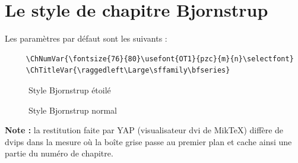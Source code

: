 \documentclass{report}
\begin{document}
    \section{Le style de chapitre Bjornstrup}
    Les paramètres par défaut sont les suivants :
    {\small\begin{verbatim}
     \ChNumVar{\fontsize{76}{80}\usefont{OT1}{pzc}{m}{n}\selectfont}
     \ChTitleVar{\raggedleft\Large\sffamily\bfseries}
    \end{verbatim}}
    \begin{figure}[h]
      \begin{minipage}{7 cm}
        \centerline{\color{gray!25}} 
        \caption{Style Bjornstrup \og étoilé \fg{}}
      \end{minipage}\hfill
      \begin{minipage}{7 cm}
        \centerline{\color{gray!25}}
        \caption{Style Bjornstrup \og normal \fg{}}
      \end{minipage}\hfill
    \end{figure}
    \textbf{Note :} la restitution faite par YAP (visualisateur dvi de MikTeX)
    diffère de dvips dans la mesure où la boîte grise passe au premier plan et
    cache ainsi une partie du numéro de chapitre. 
    \enlargethispage{2cm}
\end{document}
